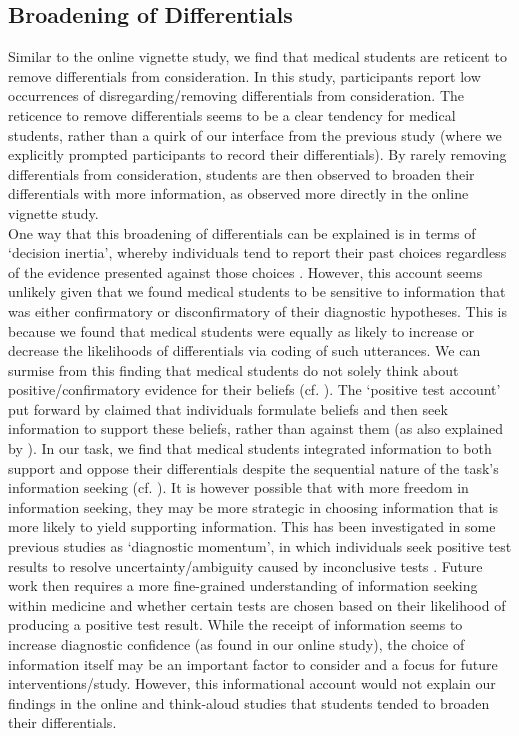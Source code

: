 \documentclass[a4paper, nobind]{templates/ociamthesis}
\begin{document}
\subsection{Broadening of Differentials}\label{broadening-of-differentials-1}

Similar to the online vignette study, we find that medical students are reticent to remove differentials from consideration. In this study, participants report low occurrences of disregarding/removing differentials from consideration. The reticence to remove differentials seems to be a clear tendency for medical students, rather than a quirk of our interface from the previous study (where we explicitly prompted participants to record their differentials). By rarely removing differentials from consideration, students are then observed to broaden their differentials with more information, as observed more directly in the online vignette study.\\

One way that this broadening of differentials can be explained is in terms of `decision inertia', whereby individuals tend to report their past choices regardless of the evidence presented against those choices \autocite{akaishi_autonomous_2014}. However, this account seems unlikely given that we found medical students to be sensitive to information that was either confirmatory or disconfirmatory of their diagnostic hypotheses. This is because we found that medical students were equally as likely to increase or decrease the likelihoods of differentials via coding of such utterances. We can surmise from this finding that medical students do not solely think about positive/confirmatory evidence for their beliefs (cf. \textcite{kaanders_humans_2022}). The `positive test account' put forward by \autocite{klayman_confirmation_1987} claimed that individuals formulate beliefs and then seek information to support these beliefs, rather than against them (as also explained by \textcite{hunt_approach-induced_2016}). In our task, we find that medical students integrated information to both support and oppose their differentials despite the sequential nature of the task's information seeking (cf. \textcite{jonas_confirmation_2001}). It is however possible that with more freedom in information seeking, they may be more strategic in choosing information that is more likely to yield supporting information. This has been investigated in some previous studies as `diagnostic momentum', in which individuals seek positive test results to resolve uncertainty/ambiguity caused by inconclusive tests \autocite{aron_diagnostic_2024}. Future work then requires a more fine-grained understanding of information seeking within medicine and whether certain tests are chosen based on their likelihood of producing a positive test result. While the receipt of information seems to increase diagnostic confidence (as found in our online study), the choice of information itself may be an important factor to consider and a focus for future interventions/study. However, this informational account would not explain our findings in the online and think-aloud studies that students tended to broaden their differentials.\\
\end{document}
